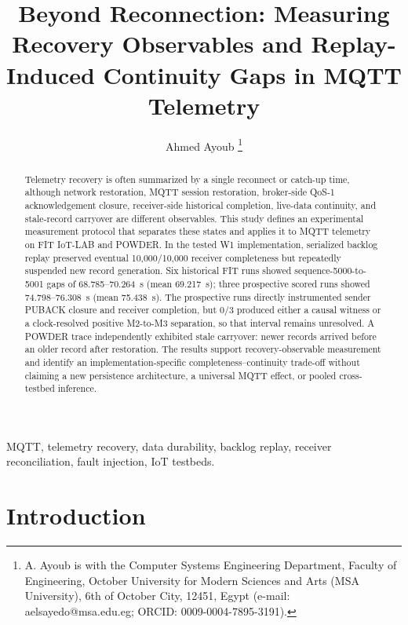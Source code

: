 \documentclass[journal]{IEEEtran}
\begin{document}
\title{Beyond Reconnection: Measuring Recovery Observables and Replay-Induced Continuity Gaps in MQTT Telemetry}

\author{Ahmed Ayoub%
\thanks{A. Ayoub is with the Computer Systems Engineering Department, Faculty of Engineering, October University for Modern Sciences and Arts (MSA University), 6th of October City, 12451, Egypt (e-mail: aelsayedo@msa.edu.eg; ORCID: 0009-0004-7895-3191).}}

\maketitle

\begin{abstract}
Telemetry recovery is often summarized by a single reconnect or catch-up time, although network restoration, MQTT session restoration, broker-side QoS-1 acknowledgement closure, receiver-side historical completion, live-data continuity, and stale-record carryover are different observables. This study defines an experimental measurement protocol that separates these states and applies it to MQTT telemetry on FIT IoT-LAB and POWDER. In the tested W1 implementation, serialized backlog replay preserved eventual 10,000/10,000 receiver completeness but repeatedly suspended new record generation. Six historical FIT runs showed sequence-5000-to-5001 gaps of 68.785--70.264~s (mean 69.217~s); three prospective scored runs showed 74.798--76.308~s (mean 75.438~s). The prospective runs directly instrumented sender PUBACK closure and receiver completion, but 0/3 produced either a causal witness or a clock-resolved positive M2-to-M3 separation, so that interval remains unresolved. A POWDER trace independently exhibited stale carryover: newer records arrived before an older record after restoration. The results support recovery-observable measurement and identify an implementation-specific completeness--continuity trade-off without claiming a new persistence architecture, a universal MQTT effect, or pooled cross-testbed inference.
\end{abstract}

\begin{IEEEkeywords}
MQTT, telemetry recovery, data durability, backlog replay, receiver reconciliation, fault injection, IoT testbeds.
\end{IEEEkeywords}

\section{Introduction}
\label{sec:introduction}
\end{document}
